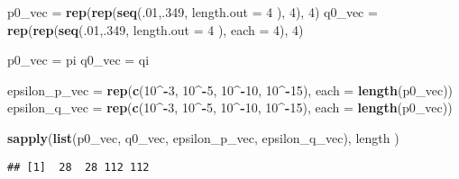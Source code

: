 \documentclass[]{article}
\newenvironment{Shaded}{\begin{snugshade}}{\end{snugshade}}
\newcommand{\KeywordTok}[1]{\textcolor[rgb]{0.13,0.29,0.53}{\textbf{#1}}}
\newcommand{\DataTypeTok}[1]{\textcolor[rgb]{0.13,0.29,0.53}{#1}}
\newcommand{\DecValTok}[1]{\textcolor[rgb]{0.00,0.00,0.81}{#1}}
\newcommand{\StringTok}[1]{\textcolor[rgb]{0.31,0.60,0.02}{#1}}
\newcommand{\OperatorTok}[1]{\textcolor[rgb]{0.81,0.36,0.00}{\textbf{#1}}}
\newcommand{\NormalTok}[1]{#1}
\begin{document}
\begin{Shaded}
\begin{Highlighting}[]
\NormalTok{p0_vec =}\StringTok{ }\KeywordTok{rep}\NormalTok{(}\KeywordTok{rep}\NormalTok{(}\KeywordTok{seq}\NormalTok{(.}\DecValTok{01}\NormalTok{,.}\DecValTok{349}\NormalTok{, }\DataTypeTok{length.out =} \DecValTok{4}\NormalTok{ ), }\DecValTok{4}\NormalTok{), }\DecValTok{4}\NormalTok{)}
\NormalTok{q0_vec =}\StringTok{ }\KeywordTok{rep}\NormalTok{(}\KeywordTok{rep}\NormalTok{(}\KeywordTok{seq}\NormalTok{(.}\DecValTok{01}\NormalTok{,.}\DecValTok{349}\NormalTok{, }\DataTypeTok{length.out =} \DecValTok{4}\NormalTok{ ), }\DataTypeTok{each =} \DecValTok{4}\NormalTok{), }\DecValTok{4}\NormalTok{)}

\NormalTok{p0_vec =}\StringTok{ }\NormalTok{pi}
\NormalTok{q0_vec =}\StringTok{ }\NormalTok{qi}

\NormalTok{epsilon_p_vec =}\StringTok{ }\KeywordTok{rep}\NormalTok{(}\KeywordTok{c}\NormalTok{(}\DecValTok{10}\OperatorTok{^-}\DecValTok{3}\NormalTok{, }\DecValTok{10}\OperatorTok{^-}\DecValTok{5}\NormalTok{, }\DecValTok{10}\OperatorTok{^-}\DecValTok{10}\NormalTok{, }\DecValTok{10}\OperatorTok{^-}\DecValTok{15}\NormalTok{), }\DataTypeTok{each =} \KeywordTok{length}\NormalTok{(p0_vec))}
\NormalTok{epsilon_q_vec =}\StringTok{ }\KeywordTok{rep}\NormalTok{(}\KeywordTok{c}\NormalTok{(}\DecValTok{10}\OperatorTok{^-}\DecValTok{3}\NormalTok{, }\DecValTok{10}\OperatorTok{^-}\DecValTok{5}\NormalTok{, }\DecValTok{10}\OperatorTok{^-}\DecValTok{10}\NormalTok{, }\DecValTok{10}\OperatorTok{^-}\DecValTok{15}\NormalTok{), }\DataTypeTok{each =} \KeywordTok{length}\NormalTok{(p0_vec))}

\KeywordTok{sapply}\NormalTok{(}\KeywordTok{list}\NormalTok{(p0_vec, q0_vec, epsilon_p_vec, epsilon_q_vec), length )}
\end{Highlighting}
\end{Shaded}

\begin{verbatim}
## [1]  28  28 112 112
\end{verbatim}
\end{document}
